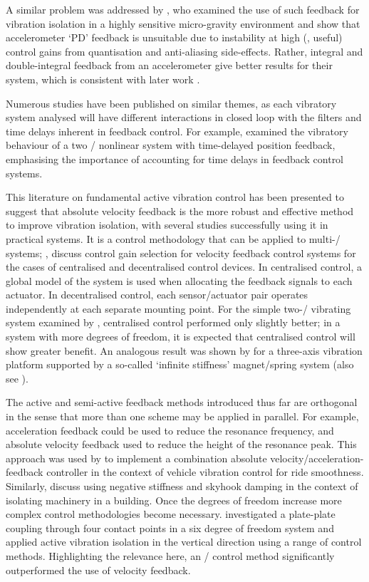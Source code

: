 \documentclass[11pt,a4paper]{memoir}
\begin{document}
A similar problem was addressed by \textcite{zhu2006}, who examined the use of such feedback for vibration isolation in a highly sensitive micro-gravity environment and show that accelerometer `PD' feedback is unsuitable due to instability at high (\ie, useful) control gains from quantisation and anti-aliasing side-effects.
Rather, integral and double-integral feedback from an accelerometer give better results for their system, which is consistent with later work \parencite{brennan2007-jsv}.

Numerous studies have been published on similar themes, as each vibratory system analysed will have different interactions in closed loop with the filters and time delays inherent in feedback control.
For example, \textcite{zhao2007} examined the vibratory behaviour of a two \dof/ nonlinear system with time-delayed position feedback, emphasising the importance of accounting for time delays in feedback control systems.

This literature on fundamental active vibration control has been presented to suggest that absolute velocity feedback is the more robust and effective method to improve vibration isolation, with several studies successfully using it in practical systems.
It is a control methodology that can be applied to multi-\dof/ systems; \eg, \textcite{engels2008} discuss control gain selection for velocity feedback control systems for the cases of centralised and decentralised control devices.
In centralised control, a global model of the system is used when allocating the feedback signals to each actuator.
In decentralised control, each sensor/actuator pair operates independently at each separate mounting point.
For the simple two-\dof/ vibrating system examined by \textcite{engels2008}, centralised control performed only slightly better; in a system with more degrees of freedom, it is expected that centralised control will show greater benefit.
An analogous result was shown by \textcite{hoque2006} for a three-axis vibration platform supported by a so-called `infinite stiffness' magnet/spring system (also see ).

The active and semi-active feedback methods introduced thus far are orthogonal in the sense that more than one scheme may be applied in parallel.
For example, acceleration feedback could be used to reduce the resonance frequency, and absolute velocity feedback used to reduce the height of the resonance peak.
This approach was used by \textcite{savaresi2007} to implement a combination absolute velocity/acceleration-feedback controller in the context of vehicle vibration control for ride smoothness.
Similarly, \textcite{gavin2007-jsv} discuss using negative stiffness and skyhook damping in the context of isolating machinery in a building.
Once the degrees of freedom increase more complex control methodologies become necessary.
\textcite{kerber2007} investigated a plate-plate coupling through four contact points in a six degree of freedom system and applied active vibration isolation in the vertical direction using a range of control methods.
Highlighting the relevance here, an \Hinf/ control method significantly outperformed the use of velocity feedback.
\end{document}
